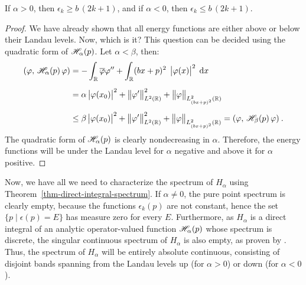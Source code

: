 \begin{claim}
    If $\alpha > 0$, then $\epsilon_k \geq b \, (2k+1)$, and if $\alpha < 0$, then $\epsilon_k \leq b \, (2k+1)$.
\end{claim}
\begin{proof}
    We have already shown that all energy functions are either above or below their Landau levels. Now, which is it? This question can be decided using the quadratic form of $\mathscr{H}_\alpha(p)$. Let $\alpha < \beta$, then:
    \begin{align*}
        (\varphi, \, \mathscr{H}_\alpha(p) \, \varphi)
        &= -\int_{\mathbb{R}} \overline{\varphi} \varphi''
        + \int_{\mathbb{R}} (b x + p)^2 \;\, \big|\varphi(x)\big|^2 \; \, \mathrm{d}x \,
        \\[5pt]
        &= \alpha \, \big|\varphi(x_0)\big|^2
        + \big\lVert \varphi' \big\rVert_{L^2(\mathbb{R})}^2
        + \big\lVert \varphi \big\rVert_{L^2_{(bx+p)^2}(\mathbb{R})}
        \\[5pt]
        &\leq \beta \, \big|\varphi(x_0)\big|^2
        + \big\lVert \varphi' \big\rVert_{L^2(\mathbb{R})}^2
        + \big\lVert \varphi \big\rVert_{L^2_{(bx+p)^2}(\mathbb{R})}
        =
        (\varphi, \, \mathscr{H}_\beta(p) \, \varphi)
        \: .
    \end{align*}
    The quadratic form of $\mathscr{H}_\alpha(p)$ is clearly nondecreasing in $\alpha$. Therefore, the energy functions will be under the Landau level for $\alpha$ negative and above it for $\alpha$ positive.
\end{proof}

Now, we have all we need to characterize the spectrum of $H_\alpha$ using Theorem~\ref{thm-direct-integral-spectrum}. If $\alpha \neq 0$, the pure point spectrum is clearly empty, because the functions $\epsilon_k(p)$ are not constant, hence the set $\{ p \; | \; \epsilon(p) = E \}$ has measure zero for every $E$. Furthermore, as $H_\alpha$ is a direct integral of an analytic operator-valued function $\mathscr{H}_\alpha(p)$ whose spectrum is discrete, the singular continuous spectrum of $H_\alpha$ is also empty, as proven by \cite{Filonov2006}. Thus, the spectrum of $H_\alpha$ will be entirely absolute continuous, consisting of disjoint bands spanning from the Landau levels up (for $\alpha>0$) or down (for $\alpha<0$).


